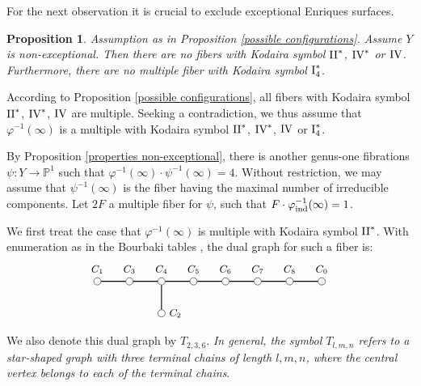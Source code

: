 \documentclass[oneside, 12pt]{amsart}
\newcommand\mylabel[1]{\label{#1}\marginpar{\vspace{-1ex}\medskip\medskip\footnotesize \tt #1}}
\renewcommand\mylabel[1]{\label{#1}}
\newtheorem{proposition}[theorem]{Proposition}
\theoremstyle{definition}
\theoremstyle{remark}
\newcommand{\PP}{\mathbb{P}}
\newcommand{\I}{\text{\rm I}}
\newcommand{\II}{\text{\rm II}}
\newcommand{\IV}{\text{\rm IV}}
\newcommand{\ra}{\rightarrow}
\newcommand{\ind}{\text{\rm ind}}
\begin{document}
\medskip
For the next observation it is crucial to  exclude exceptional Enriques surfaces.

\begin{proposition}
\mylabel{no II*, IV*, IV}
Assumption as in Proposition \ref{possible configurations}. Assume  $Y$ is non-exceptional. 
Then there are no fibers with Kodaira symbol $\II^*$, $\IV^*$ or  $\IV$. Furthermore, there are no multiple fiber
with Kodaira symbol $\I_4^*$.
\end{proposition}

\proof
According to Proposition \ref{possible configurations}, all fibers with Kodaira symbol $\II^*$, $\IV^*$, $\IV$ are multiple.
Seeking a contradiction, we thus assume that $\varphi^{-1}(\infty)$ is a multiple with  Kodaira symbol $\II^*$, $\IV^*$, $\IV$ 
or  $\I_4^*$.
 
By  Proposition \ref{properties non-exceptional}, there is another genus-one fibrations $\psi:Y\ra\PP^1$ 
such that  $\varphi^{-1}(\infty)\cdot \psi^{-1}(\infty)=4$.
Without restriction, we may assume that $\psi^{-1}(\infty)$ is the   fiber  having
the maximal number of irreducible components.
Let  $2F$  a  multiple fiber  for $\psi$, such that  $F\cdot \varphi_\ind^{-1}(\infty)=1$.
 
We first treat the case   that  
$\varphi^{-1}(\infty)$ is multiple with Kodaira symbol $\II^*$. With enumeration as in the Bourbaki tables
\cite{LIE 4-6}, the dual graph for such a  fiber is:
\begin{equation*}
\begin{gathered}
\begin{tikzpicture}
[node distance=1cm, font=\small]
\tikzstyle{vertex}=[circle, draw, fill=white, inner sep=0mm, minimum size=1.5ex]
\node[vertex]	(C1)  	at (1,0) 	[label=above:{$C_1$}] {};
\node[vertex]	(C3)			[right of=C1,  label=above:{$C_3$}]	{};
\node[vertex]	(C4)			[right of=C3,  label=above:{$C_4$}]	{};
\node[vertex]	(C2)			[below of=C4,  label=right:{$C_2$}]	{};
\node[vertex]	(C5)			[right of=C4,  label=above:{$C_5$}]	{};
\node[vertex]	(C6)			[right of=C5,  label=above:{$C_6$}]	{};
\node[vertex]	(C7)			[right of=C6,  label=above:{$C_7$}]	{};
\node[vertex]	(C8)			[right of=C7,  label=above:{$C_8$}]	{};
\node[vertex]	(C0)			[right of=C8,  label=above:{$C_0$}]	{};

\draw[thick]    (C1)--(C3)--(C4)-- (C5)--(C6)--(C7)--(C8)--(C0);
\draw[thick]    (C2)--(C4);
\end{tikzpicture}
\end{gathered}
\end{equation*}
We also denote this dual graph by $T_{2,3,6}$. \emph{In general, the symbol $T_{l,m,n}$ refers to a star-shaped graph
with three terminal chains of length $l,m,n$, where the central vertex belongs to each of the terminal chains}.
\end{document}
